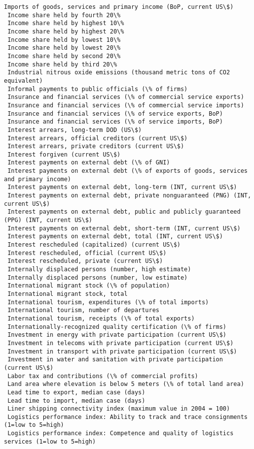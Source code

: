 \documentclass[11pt]{article}
\begin{document}
\begin{Verbatim}[commandchars=\\\{\}]
 Imports of goods, services and primary income (BoP, current US\$)
 Income share held by fourth 20\%
 Income share held by highest 10\%
 Income share held by highest 20\%
 Income share held by lowest 10\%
 Income share held by lowest 20\%
 Income share held by second 20\%
 Income share held by third 20\%
 Industrial nitrous oxide emissions (thousand metric tons of CO2 equivalent)
 Informal payments to public officials (\% of firms)
 Insurance and financial services (\% of commercial service exports)
 Insurance and financial services (\% of commercial service imports)
 Insurance and financial services (\% of service exports, BoP)
 Insurance and financial services (\% of service imports, BoP)
 Interest arrears, long-term DOD (US\$)
 Interest arrears, official creditors (current US\$)
 Interest arrears, private creditors (current US\$)
 Interest forgiven (current US\$)
 Interest payments on external debt (\% of GNI)
 Interest payments on external debt (\% of exports of goods, services and primary income)
 Interest payments on external debt, long-term (INT, current US\$)
 Interest payments on external debt, private nonguaranteed (PNG) (INT, current US\$)
 Interest payments on external debt, public and publicly guaranteed (PPG) (INT, current US\$)
 Interest payments on external debt, short-term (INT, current US\$)
 Interest payments on external debt, total (INT, current US\$)
 Interest rescheduled (capitalized) (current US\$)
 Interest rescheduled, official (current US\$)
 Interest rescheduled, private (current US\$)
 Internally displaced persons (number, high estimate)
 Internally displaced persons (number, low estimate)
 International migrant stock (\% of population)
 International migrant stock, total
 International tourism, expenditures (\% of total imports)
 International tourism, number of departures
 International tourism, receipts (\% of total exports)
 Internationally-recognized quality certification (\% of firms)
 Investment in energy with private participation (current US\$)
 Investment in telecoms with private participation (current US\$)
 Investment in transport with private participation (current US\$)
 Investment in water and sanitation with private participation (current US\$)
 Labor tax and contributions (\% of commercial profits)
 Land area where elevation is below 5 meters (\% of total land area)
 Lead time to export, median case (days)
 Lead time to import, median case (days)
 Liner shipping connectivity index (maximum value in 2004 = 100)
 Logistics performance index: Ability to track and trace consignments (1=low to 5=high)
 Logistics performance index: Competence and quality of logistics services (1=low to 5=high)

\end{Verbatim}
\end{document}
